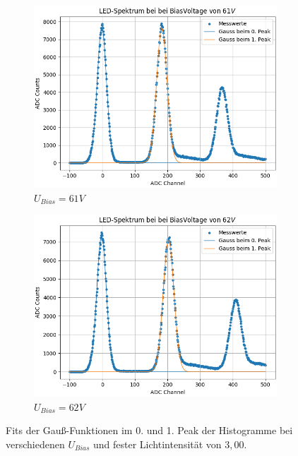 \documentclass[12pt]{article}
\begin{document}
\begin{figure}[h!]
\begin{subfigure}{0.32\textwidth}
    \includegraphics[width=\textwidth]{Grafiken/gaussfit_61}
    \caption{$U_{Bias}=61V$}
  \end{subfigure}
  \begin{subfigure}{0.32\textwidth}
    \includegraphics[width=\textwidth]{Grafiken/gaussfit_62}
    \caption{$U_{Bias}=62V$}
  \end{subfigure}
  \hfill
  \caption{Fits der Gauß-Funktionen im 0. und 1. Peak der Histogramme bei verschiedenen $U_{Bias}$ und fester Lichtintensität von $3,00$.}
  \label{GainBestimmung}
\end{figure}
\end{document}

